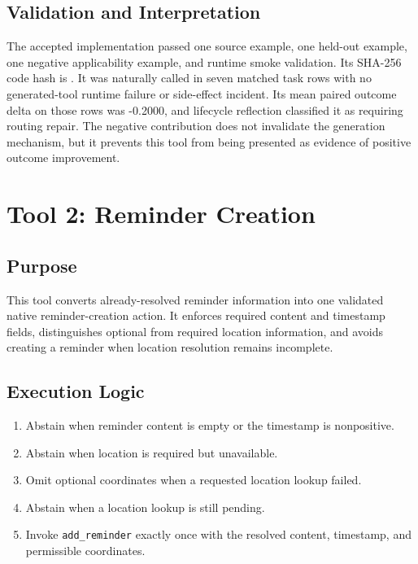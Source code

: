 \subsection{Validation and
Interpretation}\label{validation-and-interpretation}

The accepted implementation passed one source example, one held-out
example, one negative applicability example, and runtime smoke
validation. Its SHA-256 code hash is
.
It was naturally called in seven matched task rows with no
generated-tool runtime failure or side-effect incident. Its mean paired
outcome delta on those rows was -0.2000, and lifecycle reflection
classified it as requiring routing repair. The negative contribution
does not invalidate the generation mechanism, but it prevents this tool
from being presented as evidence of positive outcome improvement.

\section{Tool 2: Reminder Creation}
\label{sec:appendix-prepare-reminder-creation}

\subsection{Purpose}\label{purpose-1}

This tool converts already-resolved reminder information into one
validated native reminder-creation action. It enforces required content
and timestamp fields, distinguishes optional from required location
information, and avoids creating a reminder when location resolution
remains incomplete.

\subsection{Execution Logic}\label{execution-logic-1}

\begin{enumerate}
\def\labelenumi{\arabic{enumi}.}
\tightlist
\item
  Abstain when reminder content is empty or the timestamp is
  nonpositive.
\item
  Abstain when location is required but unavailable.
\item
  Omit optional coordinates when a requested location lookup failed.
\item
  Abstain when a location lookup is still pending.
\item
  Invoke \texttt{add\_reminder} exactly once with the resolved content,
  timestamp, and permissible coordinates.
\end{enumerate}


